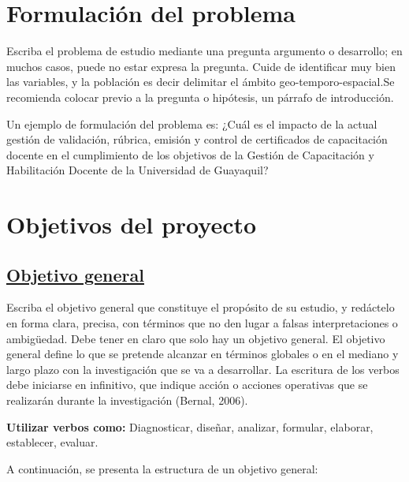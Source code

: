 \documentclass[12pt, a4paper, nofontenc, numbers=endperiod]{apa7}
\begin{document}
{	\newpage 
	
	\section{\normalsize \centering Formulación del problema}
	
	\setlength{\parindent}{1.27cm}Escriba el problema de estudio mediante una pregunta argumento o desarrollo; en muchos casos, puede no estar expresa la pregunta. Cuide de identificar muy bien las variables, y la población es decir delimitar el ámbito geo-temporo-espacial.Se recomienda colocar previo a la pregunta o hipótesis, un párrafo de introducción.
	
	\setlength{\parindent}{1.27cm}Un ejemplo de formulación del problema es: ¿Cuál es el impacto de la actual gestión de validación, rúbrica, emisión y control de certificados de capacitación docente en el cumplimiento de los objetivos de la Gestión de Capacitación y Habilitación Docente de la Universidad de Guayaquil?
	
	\section{\normalsize \centering Objetivos del proyecto} 
	\subsection*{\normalsize \underline{Objetivo general}} 
	\setlength{\parindent}{1.27cm}Escriba el objetivo general que constituye el propósito de su estudio, y redáctelo en forma clara, precisa, con términos que no den lugar a falsas interpretaciones o ambigüedad. Debe tener en claro que solo hay un objetivo general.  El objetivo general define lo que se pretende alcanzar en términos globales o en el mediano y largo plazo con la investigación que se va a desarrollar. La escritura de los verbos debe iniciarse en infinitivo, que indique acción o acciones operativas que se realizarán durante la investigación (Bernal, 2006).
	
	\setlength{\parindent}{1.27cm}\textbf{Utilizar verbos como:} Diagnosticar, diseñar, analizar, formular, elaborar, establecer, evaluar.
	
	\setlength{\parindent}{1.27cm}A continuación, se presenta la estructura de un objetivo general:
	
}
\end{document}
